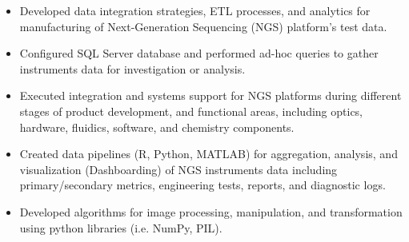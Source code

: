 \documentclass[10pt,a4paper]{altacv}
\begin{document}
\tagline{}

%

\begin{fullwidth}
\makecvheader
\end{fullwidth}

%





\begin{itemize}
    \item   \small{Developed data integration strategies, ETL processes, and analytics for manufacturing of Next-Generation Sequencing (NGS) platform's test data.}
    \item   \small{Configured SQL Server database and performed ad-hoc queries to gather instruments data for investigation or analysis.}

\end{itemize}

\medskip



\begin{itemize}
    \item   \small{Executed integration and systems support for NGS platforms during different stages of product development, and functional areas, including optics, hardware, fluidics, software, and chemistry components.}
    \item   \small{Created data pipelines (R, Python, MATLAB) for aggregation, analysis, and visualization (Dashboarding) of NGS instruments data including primary/secondary metrics, engineering tests, reports, and diagnostic logs.}
    \item   \small{Developed algorithms for image processing, manipulation, and transformation using python libraries (i.e. NumPy, PIL).}
\end{itemize}
\end{document}
